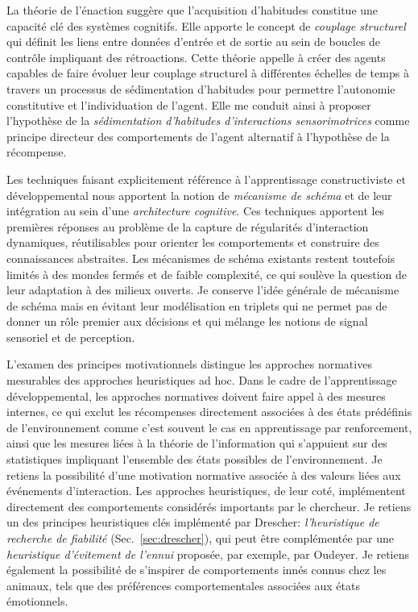 La théorie de l'énaction suggère que l'acquisition d'habitudes constitue une capacité clé des systèmes cognitifs. 
Elle apporte le concept de \emph{couplage structurel} qui définit les liens entre données d'entrée et de sortie au sein de boucles de contrôle impliquant des rétroactions. 
Cette théorie appelle à créer des agents capables de faire évoluer leur couplage structurel à différentes échelles de temps à travers un processus de sédimentation d'habitudes pour permettre l'autonomie constitutive et l'individuation de l'agent. 
Elle me conduit ainsi à proposer l'hypothèse de la \emph{sédimentation d'habitudes d'interactions sensorimotrices} comme principe directeur des comportements de l'agent alternatif à l'hypothèse de la récompense. 

Les techniques faisant explicitement référence à l'apprentissage constructiviste et développemental nous apportent la notion de \emph{mécanisme de schéma} et de leur intégration au sein d'une \emph{architecture cognitive}.
Ces techniques apportent les premières réponses au problème de la capture de régularités d'interaction dynamiques, réutilisables pour orienter les comportements et construire des connaissances abstraites. 
Les mécanismes de schéma existants restent toutefois limités à des mondes fermés et de faible complexité, ce qui soulève la question de leur adaptation à des milieux ouverts. 
Je conserve l'idée générale de mécanisme de schéma mais en évitant leur modélisation en triplets  qui ne permet pas de donner un rôle premier aux décisions et qui mélange les notions de signal sensoriel et de perception. 



L'examen des principes motivationnels distingue les approches normatives mesurables des approches heuristiques ad hoc.
Dans le cadre de l'apprentissage développemental, les approches normatives doivent faire appel à des mesures internes, ce qui exclut les récompenses directement associées à des états prédéfinis  de l'environnement comme c'est souvent le cas en apprentissage par renforcement, ainsi que les mesures liées à la théorie de l'information qui s'appuient sur des statistiques impliquant l'ensemble des états possibles de l'environnement. 
Je retiens la possibilité d'une motivation normative associée à des valeurs liées aux événements d'interaction.
Les approches heuristiques, de leur coté,  implémentent directement des comportements considérés importants par le chercheur.
Je retiens un des principes heuristiques clés implémenté par Drescher:  \emph{l'heuristique de recherche de fiabilité}  (Sec.~\ref{sec:drescher}), qui peut être complémentée par une \emph{heuristique d'évitement de l'ennui} proposée, par exemple, par Oudeyer.
Je retiens également la possibilité de s'inspirer de comportements innés connus chez les animaux, tels que des préférences comportementales associées aux états émotionnels. 



